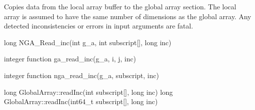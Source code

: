\documentclass[12pt]{article}
\begin{document}
\ncoll

\begin{desc}

Copies data from the local array buffer to the global array section. The local
array is assumed to have the same number of dimensions as the global array.
Any detected inconsistencies or errors in input arguments are fatal.

\end{desc}


\begin{capi}
\begin{ccode}
long NGA_Read_inc(int g_a, int subscript[], long inc)
\end{ccode}
\begin{funcargs}
\end{funcargs}
\end{capi}

\begin{f2dapi}
\begin{fcode}
integer function ga_read_inc(g_a, i, j, inc)
\end{fcode}
\begin{funcargs}
\end{funcargs}
\end{f2dapi}

\begin{fapi}
\begin{fcode}
integer function nga_read_inc(g_a, subscript, inc)
\end{fcode}
\begin{funcargs}
\end{funcargs}
\end{fapi}

\begin{cxxapi}
\begin{cxxcode}
long GlobalArray::readInc(int subscript[], long inc)
long GlobalArray::readInc(int64_t subscript[], long inc)
\end{cxxcode}
\begin{funcargs}
\end{funcargs}
\end{cxxapi}
\end{document}
